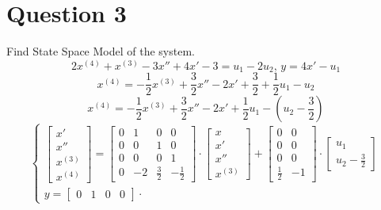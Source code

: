 \documentclass[12pt,letterpaper]{article}
\begin{document}
\section*{Question 3}
\setcounter{equation}{0}
\begin{enumerate}[leftmargin=!,labelindent=5pt]
    Find State Space Model of the system.
     \begin{equation*}
         2x^{(4)} + x^{(3)} - 3 x'' + 4x' -3 = u_1 - 2u_2\text{,  } y=4x'-u_1
     \end{equation*}
     \begin{equation*}
         x^{(4)} = -\frac{1}{2}x^{(3)} + \frac{3}{2}x'' -2x' + \frac{3}{2} + \frac{1}{2}u_1 - u_2
     \end{equation*}
     \begin{equation*}
         x^{(4)} = -\frac{1}{2}x^{(3)} + \frac{3}{2}x'' -2x'  + \frac{1}{2}u_1 - (u_2 - \frac{3}{2})
     \end{equation*}
     \begin{equation*}
         \begin{cases}
            \left[\begin{matrix}x'\\x''\\x^{(3)}\\x^{(4)}\end{matrix}\right] =
            \left[\begin{matrix}0&1&0&0\\0&0&1&0\\0&0&0&1\\0&-2&\frac{3}{2}&-\frac{1}{2}\end{matrix}\right] \cdot
            \left[\begin{matrix}x\\x'\\x''\\x^{(3)}\end{matrix}\right] + 
            \left[\begin{matrix}0&0\\0&0\\0&0\\\frac{1}{2}&-1\end{matrix}\right] \cdot
            \left[\begin{matrix}u_1\\u_2 - \frac{3}{2}\end{matrix}\right]
            \\
            y = \left[\begin{matrix}0&1&0&0\end{matrix}\right] \cdot

\end{cases}
\end{equation*}
\end{enumerate}
\end{document}
